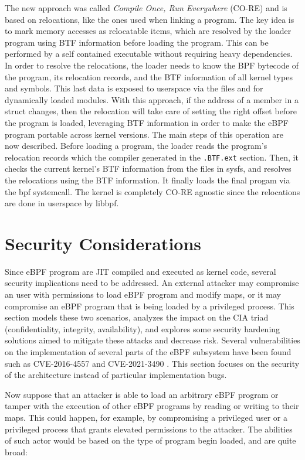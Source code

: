 The new approach was called \textit{Compile Once, Run Everywhere} (CO-RE) and is
based on relocations, like the ones used when linking a program. The key idea is
to mark memory accesses as relocatable items, which are resolved by the loader
program using BTF information before loading the program. This can be performed
by a self contained executable without requiring heavy dependencies. In order to
resolve the relocations, the loader needs to know the BPF bytecode of the
program, its relocation records, and the BTF information of all kernel types and
symbols. This last data is exposed to userspace via the files
 and  for
dynamically loaded modules. With this approach, if the address of a member in a
struct changes, then the relocation will take care of setting the right offset
before the program is loaded, leveraging BTF information in order to make the
eBPF program portable across kernel versions. The main steps of this operation
are now described. Before loading a program, the loader reads the program's
relocation records which the compiler generated in the \verb|.BTF.ext| section.
Then, it checks the current kernel's BTF information from the files in sysfs,
and resolves the relocations using the BTF information. It finally loads the
final progam via the bpf systemcall. The kernel is completely CO-RE agnostic
since the relocations are done in userspace by libbpf.

\section{Security Considerations}

Since eBPF program are JIT compiled and executed as kernel code, several
security implications need to be addressed. An external attacker may compromise
an user with permissions to load eBPF program and modify maps, or it may
compromise an eBPF program that is being loaded by a privileged process. This
section models these two scenarios, analyzes the impact on the CIA triad
(confidentiality, integrity, availability), and explores some security hardening
solutions aimed to mitigate these attacks and decrease risk. Several
vulnerabilities on the implementation of several parts of the eBPF subsystem
have been found \cite{ebpf_security} such as CVE-2016-4557 \cite{cve20164557}
and CVE-2021-3490 \cite{cve20213490}. This section focuses on the security of
the architecture instead of particular implementation bugs.

Now suppose that an attacker is able to load an arbitrary eBPF program or tamper
with the execution of other eBPF programs by reading or writing to their maps.
This could happen, for example, by compromising a privileged user or a
privileged process that grants elevated permissions to the attacker. The
abilities of such actor would be based on the type of program begin loaded, and
are quite broad:


